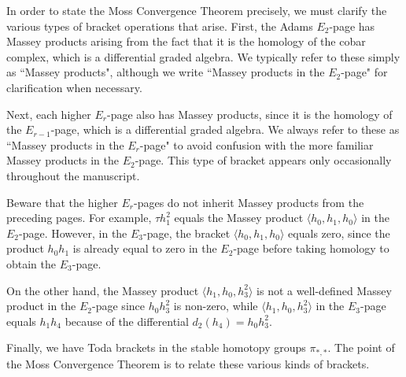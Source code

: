 In order to state the Moss Convergence Theorem precisely, 
we must clarify the
various types of bracket operations that arise.
First, the Adams $E_2$-page has Massey products 
arising from the fact that
it is the homology of the cobar complex, which is a 
differential graded algebra.  We typically refer to these
simply as ``Massey products", although we write
``Massey products in the $E_2$-page" for clarification when necessary.

Next, each higher $E_r$-page
also has Massey products, since it is the homology of the
$E_{r-1}$-page, which is a differential graded algebra.
We always refer to these as ``Massey products in the $E_r$-page"
to avoid confusion with the more familiar Massey products in
the $E_2$-page.  This type of bracket appears only occasionally 
throughout the manuscript.

Beware that the higher $E_r$-pages do not inherit Massey products
from the preceding pages.  For example, $\tau h_1^2$ equals the
Massey product $\langle h_0, h_1, h_0 \rangle$ in the $E_2$-page.
However, in the $E_3$-page, the bracket $\langle h_0, h_1, h_0 \rangle$
equals zero, since the product $h_0 h_1$ is already equal to zero
in the $E_2$-page before taking homology to obtain the $E_3$-page.

On the other hand, the Massey product $\langle h_1, h_0, h_3^2 \rangle$
is not a well-defined Massey product in the $E_2$-page since
$h_0 h_3^2$ is non-zero, while $\langle h_1, h_0, h_3^2 \rangle$
in the $E_3$-page equals $h_1 h_4$ because of the differential
$d_2(h_4) = h_0 h_3^2$.

Finally, we have Toda brackets in the stable homotopy groups
$\pi_{*,*}$.  The point of the Moss Convergence Theorem is to relate
these various kinds of brackets.




